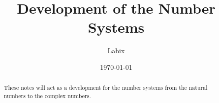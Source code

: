 \documentclass[a4paper]{article}
\title{Development of the Number Systems}
\author{Labix}
\date{\today}
\begin{document}
\maketitle
\begin{abstract}
These notes will act as a development for the number systems from the natural numbers to the complex numbers. 
\end{abstract}
\tableofcontents
\pagebreak

\end{document}
